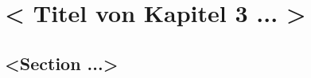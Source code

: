 \setcounter{equation}{0}

\clearpage


\chapter{< Titel von Kapitel 3 ... >}


\section{<Section ...>}
